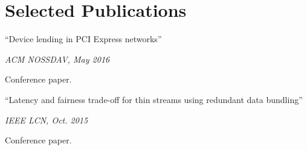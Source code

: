 \section{Selected Publications}
\parbox[t][][t]{\linewidth}{
	\parbox{\linewidth}{{``Device lending in PCI Express networks''}}
	\smallbreak
	\parbox{\linewidth}{\emph{ACM NOSSDAV, May 2016}}
	\smallbreak
	Conference paper.
	\bigbreak
}

\parbox[t][][t]{\linewidth}{
	\parbox{\linewidth}{{``Latency and fairness trade-off for thin
	streams using redundant data bundling''}}
	\smallbreak
	\parbox{\linewidth}{\emph{IEEE LCN, Oct. 2015}}
	\smallbreak
	Conference paper.
	\bigbreak
}

